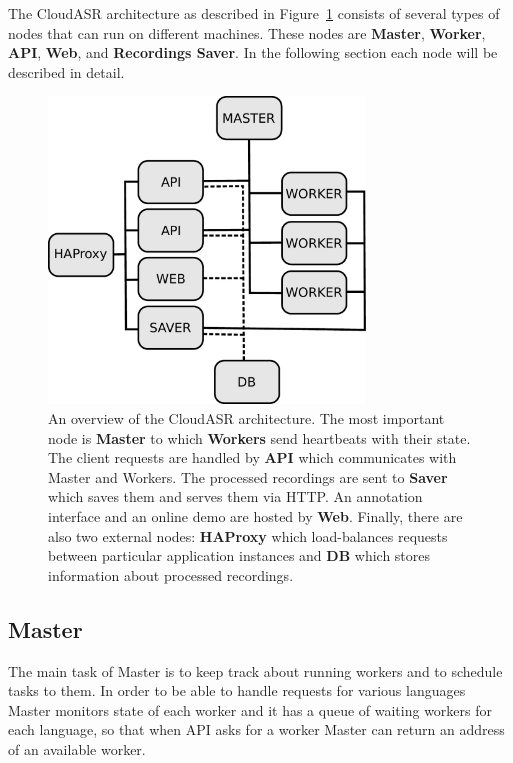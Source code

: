 The CloudASR architecture as described in Figure~\ref{fig:architecture} consists of several types of nodes that can run on different machines.
These nodes are \textbf{Master}, \textbf{Worker}, \textbf{API}, \textbf{Web},  and \textbf{Recordings Saver}.
In the following section each node will be described in detail.


\begin{figure}[h]
  \centering
  \includegraphics[width=0.75\textwidth]{./img/architecture.pdf}

  \caption{
    An overview of the CloudASR architecture.
    The most important node is \textbf{Master} to which \textbf{Workers} send heartbeats with their state.
    The client requests are handled by \textbf{API} which communicates with Master and Workers.
    The processed recordings are sent to \textbf{Saver} which saves them and serves them via HTTP.
    An annotation interface and an online demo are hosted by \textbf{Web}.
    Finally, there are also two external nodes: \textbf{HAProxy}
      which load-balances requests between particular application instances
      and \textbf{DB} which stores information about processed recordings.
  }
  \label{fig:architecture}
\end{figure}


\subsection{Master}
The main task of Master is to keep track about running workers and to schedule tasks to them.
In order to be able to handle requests for various languages
  Master monitors state of each worker
  and it has a queue of waiting workers for each language,
    so that when API asks for a worker Master can return an address of an available worker.

